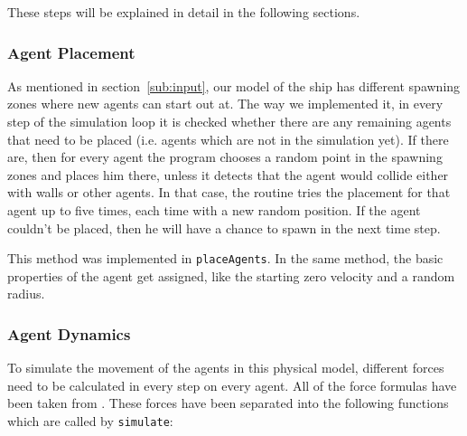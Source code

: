 \documentclass[11pt]{article}
\begin{document}
These steps will be explained in detail in the following sections.

\subsubsection{Agent Placement}

As mentioned in section~\ref{sub:input}, our model of the ship has different
spawning zones where new agents can start out at.  The way we implemented it,
in every step of the simulation loop it is checked whether there are any
remaining agents that need to be placed (i.e. agents which are not in the
simulation yet).  If there are, then for every agent the program chooses a
random point in the spawning zones and places him there, unless it detects that
the agent would collide either with walls or other agents.  In that case, the
routine tries the placement for that agent up to five times, each time with a
new random position.  If the agent couldn't be placed, then he will have a
chance to spawn in the next time step.

This method was implemented in \texttt{placeAgents}.  In the same method, the
basic properties of the agent get assigned, like the starting zero velocity and
a random radius.

\subsubsection{Agent Dynamics}
\label{sub:movement}

To simulate the movement of the agents in this physical model, different forces
need to be calculated in every step on every agent.  All of the force formulas
have been taken from \cite{helbing}.  These forces have been separated into the
following functions which are called by \texttt{simulate}:
\end{document}
